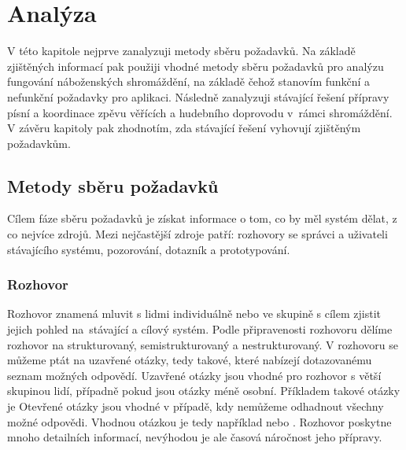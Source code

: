 \chapter{Analýza}

\begin{chapterabstract}
    V této kapitole nejprve zanalyzuji metody sběru požadavků. Na základě zjištěných informací pak použiji vhodné metody sběru požadavků pro analýzu fungování náboženských shromáždění, na základě čehož stanovím funkční a nefunkční požadavky pro aplikaci. Následně zanalyzuji stávající řešení přípravy písní a koordinace zpěvu věřících a hudebního doprovodu v~rámci shromáždění. V závěru kapitoly pak zhodnotím, zda stávající řešení vyhovují zjištěným požadavkům.
\end{chapterabstract}

\section{Metody sběru požadavků}

Cílem fáze sběru požadavků je získat informace o tom, co by měl systém dělat, z co nejvíce zdrojů. Mezi nejčastější zdroje patří: rozhovory se správci a uživateli stávajícího systému, pozorování, dotazník a prototypování. \cite{determining-system-requirements}

\subsection{Rozhovor}

Rozhovor znamená mluvit s lidmi individuálně nebo ve skupině s cílem zjistit jejich pohled na~stávající a cílový systém. Podle připravenosti rozhovoru dělíme rozhovor na strukturovaný, semistrukturovaný a nestrukturovaný. V rozhovoru se můžeme ptát na uzavřené otázky, tedy takové, které nabízejí dotazovanému seznam možných odpovědí. Uzavřené otázky jsou vhodné pro rozhovor s větší skupinou lidí, případně pokud jsou otázky méně osobní. \cite{determining-system-requirements} Příkladem takové otázky je  Otevřené otázky jsou vhodné v případě, kdy nemůžeme odhadnout všechny možné odpovědi. Vhodnou otázkou je tedy například  nebo . Rozhovor poskytne mnoho detailních informací, nevýhodou je ale časová náročnost jeho přípravy.

